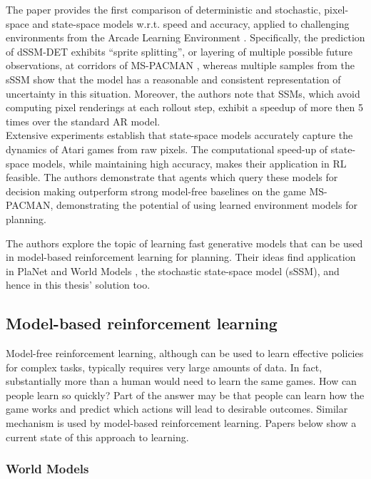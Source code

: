 The paper provides the first comparison of deterministic and stochastic, pixel-space and state-space models w.r.t. speed and accuracy, applied to challenging environments from the Arcade Learning Environment \cite{Code.ALE}. Specifically, the prediction of dSSM-DET exhibits “sprite splitting”, or layering of multiple possible future observations, at corridors of MS-PACMAN \cite{Game.MSPACMAN}, whereas multiple samples from the sSSM show that the model has a reasonable and consistent representation of uncertainty in this situation. Moreover, the authors note that SSMs, which avoid computing pixel renderings at each rollout step, exhibit a speedup of more then 5 times over the standard AR model. \\
Extensive experiments establish that state-space models accurately capture the dynamics of Atari games from raw pixels. The computational speed-up of state-space models, while maintaining high accuracy, makes their application in RL feasible. The authors demonstrate that agents which query these models for decision making outperform strong model-free baselines on the game MS-PACMAN, demonstrating the potential of using learned environment models for planning.

The authors explore the topic of learning fast generative models that can be used in model-based reinforcement learning for planning. Their ideas find application in PlaNet \cite{Algo.PlaNet} and World Models \cite{Algo.WorldModels}, the stochastic state-space model (sSSM), and hence in this thesis' solution too.

\subsection{Model-based reinforcement learning}

Model-free reinforcement learning, although can be used to learn effective policies for complex tasks, typically requires very large amounts of data. In fact, substantially more than a human would need to learn the same games. How can people learn so quickly? Part of the answer may be that people can learn how the game works and predict which actions will lead to desirable outcomes. Similar mechanism is used by model-based reinforcement learning. Papers below show a current state of this approach to learning.

\subsubsection{World Models}

